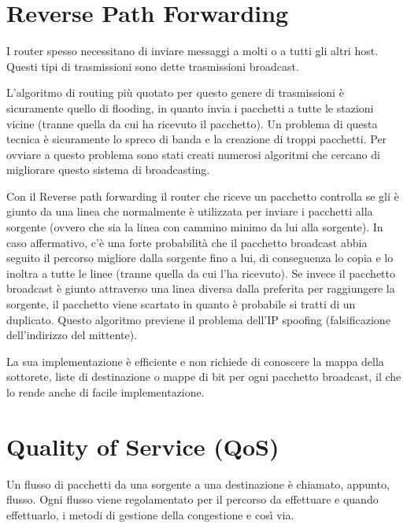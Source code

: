 \section{Reverse Path Forwarding}

I router spesso necessitano di inviare messaggi a molti o a tutti gli altri host. Questi tipi di trasmissioni sono dette trasmissioni broadcast.

L’algoritmo di routing più quotato per questo genere di trasmissioni è sicuramente quello di flooding, in quanto invia i pacchetti a tutte le stazioni vicine (tranne quella da cui ha ricevuto il pacchetto). Un problema di questa tecnica è sicuramente lo spreco di banda e la creazione di troppi pacchetti.
Per ovviare a questo problema sono stati creati numerosi algoritmi che cercano di migliorare questo sistema di broadcasting.

Con il Reverse path forwarding il router che riceve un pacchetto controlla se gli è giunto da una linea che normalmente è utilizzata per inviare i pacchetti alla sorgente (ovvero che sia la linea con cammino minimo da lui alla sorgente). In caso affermativo, c’è una forte probabilità che il pacchetto broadcast abbia seguito il percorso migliore dalla sorgente fino a lui, di conseguenza lo copia e lo inoltra a tutte le linee (tranne quella da cui l’ha ricevuto). Se invece il pacchetto broadcast è giunto attraverso una linea diversa dalla preferita per raggiungere la sorgente, il pacchetto viene scartato in quanto è probabile si tratti di un duplicato.
Questo algoritmo previene il problema dell’IP spoofing (falsificazione dell’indirizzo del mittente).

La sua implementazione è efficiente e non richiede di conoscere la mappa della sottorete, liste di destinazione o mappe di bit per ogni pacchetto broadcast, il che lo rende anche di facile implementazione.

\section{Quality of Service (QoS)}

Un flusso di pacchetti da una sorgente a una destinazione è chiamato, appunto, flusso.
Ogni flusso viene regolamentato per il percorso da effettuare e quando effettuarlo, i metodi di gestione della congestione e così via.

